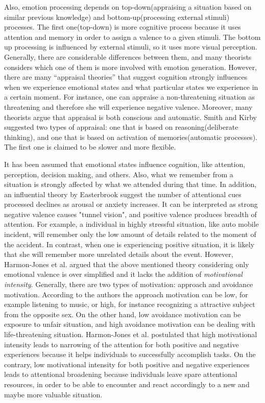 \documentclass[a4paper]{report}
\begin{document}
		Also, emotion processing depends on top-down(appraising a situation based on similar previous knowledge) and bottom-up(processing external stimuli) processes. The first one(top-down) is more cognitive process because it uses attention and memory in order to assign a valence to a given stimuli. The bottom up processing is influenced by external stimuli, so it uses more visual perception. Generally, there are considerable differences between them, and many theorists considers which one of them is more involved with emotion generation. However, there are many ``appraisal theories'' that suggest cognition strongly influences when we experience emotional states and what particular states we experience in a certain moment. For instance, one can appraise a non-threatening situation as threatening and therefore she will experience negative valence. Moreover, many theorists argue that appraisal is both conscious and automatic. Smith and Kirby\cite{smith2009putting} suggested two types of appraisal: one that is based on reasoning(deliberate thinking), and one that is based on activation of memories(automatic processes). The first one is claimed to be slower and more flexible. 
		
		It has been assumed that emotional states influence cognition\cite{blanchette2010influence}, like attention, perception, decision making, and others. Also, what we remember from a situation is strongly affected by what we attended during that time\cite{eriksen1986visual}. In addition, an influential theory by Easterbrook\cite{easterbrook1959effect} suggest the number of attentional cues processed declines as arousal or anxiety increases. It can be interpreted as strong negative valence causes "tunnel vision", and positive valence produces breadth of attention. For example, a individual in highly stressful situation, like auto mobile incident, will remember only the low amount of details related to the moment of the accident. In contrast, when one is experiencing positive situation, it is likely that she will remember more unrelated details about the event. However, Harmon-Jones et al.\cite{harmon2011toward} argued that the above mentioned theory considering only emotional valence is over simplified and it lacks the addition of \textit{motivational intensity}. Generally, there are two types of motivation: approach and avoidance motivation. According to the authors the approach motivation can be low, for example listening to music, or high, for instance recognizing a attractive subject from the opposite sex. On the other hand, low avoidance motivation can be exposure to unfair situation, and high avoidance motivation can be dealing with life-threatening situation. Harmon-Jones et al.\cite{harmon2011toward} postulated that high motivational intensity leads to narrowing of the attention for both positive and negative experiences because it helps individuals to successfully accomplish tasks. On the contrary, low motivational intensity for both positive and negative experiences leads to attentional broadening because individuals leave spare attentional resources, in order to be able to encounter and react accordingly to a new and maybe more valuable situation.
		
\end{document}
